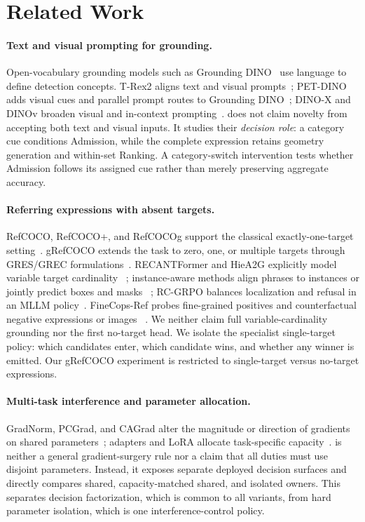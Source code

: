\section{Related Work}
\label{sec:related}

\paragraph{Text and visual prompting for grounding.}
Open-vocabulary grounding models such as Grounding
DINO~\cite{liu2025groundingdino} use language to define detection concepts.
T-Rex2 aligns text and visual prompts~\cite{jiang2024trex2}; PET-DINO adds
visual cues and parallel prompt routes to Grounding
DINO~\cite{fu2026petdino}; DINO-X and DINOv broaden visual and in-context
prompting~\cite{ren2024dinox,li2024dinov}.  \method does not claim novelty from
accepting both text and visual inputs.  It studies their \emph{decision role}:
a category cue conditions Admission, while the complete expression retains
geometry generation and within-set Ranking.  A category-switch intervention
tests whether Admission follows its assigned cue rather than merely preserving
aggregate accuracy.

\paragraph{Referring expressions with absent targets.}
RefCOCO, RefCOCO+, and RefCOCOg support the classical exactly-one-target
setting~\cite{yu2016modelingcontext,mao2016generation}.  gRefCOCO extends the
task to zero, one, or multiple targets through GRES/GREC
formulations~\cite{liu2023gres,he2023grec,ding2026grex}.  RECANTFormer and
HieA2G explicitly model variable target cardinality
~\cite{hemanthage2024recantformer,wang2025hiea2g}; instance-aware methods align
phrases to instances or jointly predict boxes and masks
~\cite{nguyen2024instalign,dai2026instancevg}; RC-GRPO balances localization
and refusal in an MLLM policy~\cite{yang2026rcgrpo}.  FineCops-Ref probes
fine-grained positives and counterfactual negative expressions or images
~\cite{liu2024finecops}.  We neither claim full variable-cardinality grounding
nor the first no-target head.  We isolate the specialist single-target policy:
which candidates enter, which candidate wins, and whether any winner is
emitted.  Our gRefCOCO experiment is restricted to single-target versus
no-target expressions.

\paragraph{Multi-task interference and parameter allocation.}
GradNorm, PCGrad, and CAGrad alter the magnitude or direction of gradients on
shared parameters~\cite{chen2018gradnorm,yu2020pcgrad,liu2021cagrad}; adapters
and LoRA allocate task-specific capacity~\cite{houlsby2019adapters,hu2022lora}.
\method is neither a general gradient-surgery rule nor a claim that all duties
must use disjoint parameters.  Instead, it exposes separate deployed decision
surfaces and directly compares shared, capacity-matched shared, and isolated
owners.  This separates decision factorization, which is common to all
variants, from hard parameter isolation, which is one interference-control
policy.
